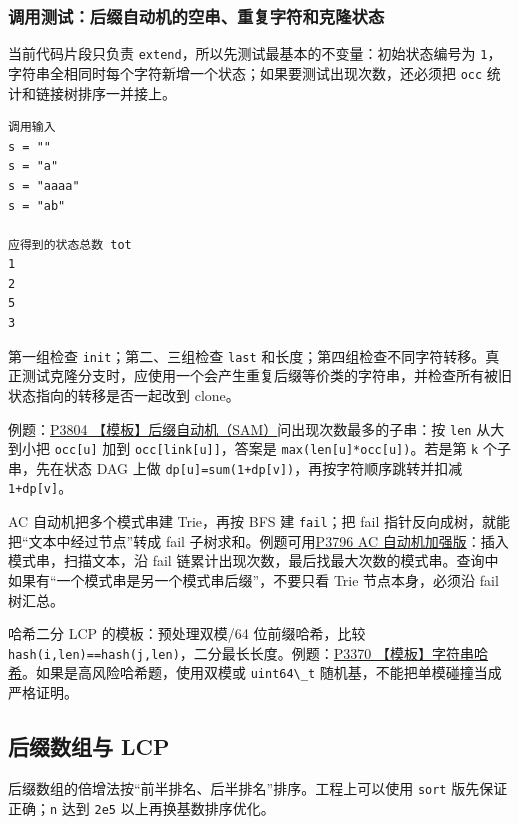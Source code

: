 \subsubsection{调用测试：后缀自动机的空串、重复字符和克隆状态}

当前代码片段只负责 \passthrough{\lstinline!extend!}，所以先测试最基本的不变量：初始状态编号为 \passthrough{\lstinline!1!}，字符串全相同时每个字符新增一个状态；如果要测试出现次数，还必须把 \passthrough{\lstinline!occ!} 统计和链接树排序一并接上。

\begin{lstlisting}
调用输入
s = ""
s = "a"
s = "aaaa"
s = "ab"

应得到的状态总数 tot
1
2
5
3
\end{lstlisting}

第一组检查 \passthrough{\lstinline!init!}；第二、三组检查 \passthrough{\lstinline!last!} 和长度；第四组检查不同字符转移。真正测试克隆分支时，应使用一个会产生重复后缀等价类的字符串，并检查所有被旧状态指向的转移是否一起改到 clone。

例题：\href{https://www.luogu.com.cn/problem/P3804}{P3804 【模板】后缀自动机（SAM）}问出现次数最多的子串：按 \passthrough{\lstinline!len!} 从大到小把 \passthrough{\lstinline!occ[u]!} 加到 \passthrough{\lstinline!occ[link[u]]!}，答案是 \passthrough{\lstinline!max(len[u]*occ[u])!}。若是第 \passthrough{\lstinline!k!} 个子串，先在状态 DAG 上做 \passthrough{\lstinline!dp[u]=sum(1+dp[v])!}，再按字符顺序跳转并扣减 \passthrough{\lstinline!1+dp[v]!}。

AC 自动机把多个模式串建 Trie，再按 BFS 建 \passthrough{\lstinline!fail!}；把 fail 指针反向成树，就能把``文本中经过节点''转成 fail 子树求和。例题可用\href{https://www.luogu.com.cn/problem/P3796}{P3796 AC 自动机加强版}：插入模式串，扫描文本，沿 fail 链累计出现次数，最后找最大次数的模式串。查询中如果有``一个模式串是另一个模式串后缀''，不要只看 Trie 节点本身，必须沿 fail 树汇总。

哈希二分 LCP 的模板：预处理双模/64 位前缀哈希，比较 \passthrough{\lstinline!hash(i,len)==hash(j,len)!}，二分最长长度。例题：\href{https://www.luogu.com.cn/problem/P3370}{P3370 【模板】字符串哈希}。如果是高风险哈希题，使用双模或 \passthrough{\lstinline!uint64\_t!} 随机基，不能把单模碰撞当成严格证明。


\subsection{后缀数组与 LCP}

后缀数组的倍增法按``前半排名、后半排名''排序。工程上可以使用 \passthrough{\lstinline!sort!} 版先保证正确；\passthrough{\lstinline!n!} 达到 \passthrough{\lstinline!2e5!} 以上再换基数排序优化。

